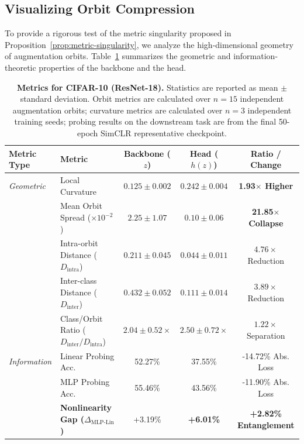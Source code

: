 \documentclass{article}
\theoremstyle{plain}
\theoremstyle{definition}
\theoremstyle{remark}
\begin{document}
\subsection{Visualizing Orbit Compression}

To provide a rigorous test of the metric singularity proposed in Proposition~\ref{prop:metric-singularity}, we analyze the high-dimensional geometry of augmentation orbits. Table~\ref{tab:master-metrics} summarizes the geometric and information-theoretic properties of the backbone and the head.

\begin{table}[ht]
\centering
\scriptsize
\caption{\textbf{Metrics for CIFAR-10 (ResNet-18).} Statistics are reported as mean $\pm$ standard deviation. Orbit metrics are calculated over $n=15$ independent augmentation orbits; curvature metrics are calculated over $n=3$ independent training seeds; probing results on the downstream task are from the final 50-epoch SimCLR representative checkpoint.}
\label{tab:master-metrics}
\begin{tabular}{@{}llccc@{}}
\toprule
\textbf{Metric Type} & \textbf{Metric} & \textbf{Backbone ($z$)} & \textbf{Head ($h(z)$)} & \textbf{Ratio / Change} \\ 
\midrule
\textit{Geometric} & Local Curvature & $0.125 \pm 0.002$ & $0.242 \pm 0.004$ & \textbf{1.93$\times$ Higher} \\
      & Mean Orbit Spread ($\times 10^{-2}$) & $2.25 \pm 1.07$ & $0.10 \pm 0.06$ & \textbf{21.85$\times$ Collapse} \\
                   & Intra-orbit Distance ($D_{\text{intra}}$) & $0.211 \pm 0.045$ & $0.044 \pm 0.011$ & $4.76\times$ Reduction \\
                   & Inter-class Distance ($D_{\text{inter}}$) & $0.432 \pm 0.052$ & $0.111 \pm 0.014$ & $3.89\times$ Reduction \\
                   & Class/Orbit Ratio ($D_{\text{inter}} / D_{\text{intra}}$) & $2.04 \pm 0.52\times$ & $2.50\pm0.72\times$ & $1.22\times$ Separation \\ 
\midrule
\textit{Information} & Linear Probing Acc. & 52.27\% & 37.55\% & -14.72\% Abs. Loss \\
          & MLP Probing Acc. & 55.46\% & 43.56\% & -11.90\% Abs. Loss \\
                     & \textbf{Nonlinearity Gap ($\Delta_{\text{MLP-Lin}}$)} & +3.19\% & \textbf{+6.01\%} & \textbf{+2.82\% Entanglement} \\ 
\bottomrule
\end{tabular}
\end{table}
\end{document}
